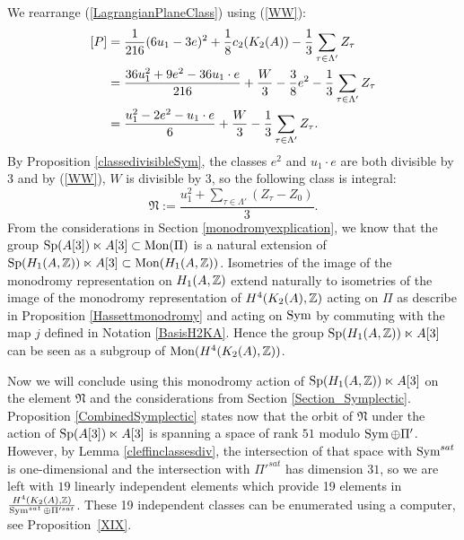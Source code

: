 We rearrange (\ref{LagrangianPlaneClass}) using (\ref{WW}):
\begin{align*}
\left[P\right]&=\frac{1}{216}(6u_1-3e)^2+\frac{1}{8}c_2(K_{ 2 }( A ))-\frac{1}{3}\sum_{\tau\in \Lambda'} Z_{\tau}\\
&=\frac{36u_1^2+9e^2-36u_1\cdot e}{216} +\frac{W}{3}-\frac{3}{8}e^2-\frac{1}{3}\sum_{\tau\in \Lambda'} Z_{\tau}\\
&=\frac{u_1^2-2e^2-u_1\cdot e}{6} +\frac{W}{3}-\frac{1}{3}\sum_{\tau\in \Lambda'} Z_{\tau}.
\end{align*}
By Proposition \ref{classedivisibleSym}, the classes $e^2$ and $u_1\cdot e$ are both divisible by 3 and by (\ref{WW}), $W$ is divisible by 3, so the following class is integral:
$$
\mathfrak{N}:=\frac{u_1^2+\sum_{\tau\in \Lambda'} (Z_{\tau}-Z_0)}{3}
.
$$
From the considerations in Section \ref{monodromyexplication}, we know that the group $\operatorname{Sp}(A[3])\ltimes A[3]\subset \operatorname{Mon}(\Pi)$ is a natural extension of 
$\operatorname{Sp}(H_1(A,\mathbb{Z}))\ltimes A[3]\subset \operatorname{Mon}(H_1(A,\mathbb{Z}))$. Isometries of the image of the monodromy representation on $H_1(A,\mathbb{Z})$ extend naturally to isometries of the image of the monodromy representation of $H^4(K_2(A),\mathbb{Z})$ acting on $\Pi$ as describe in Proposition \ref{Hassettmonodromy} and acting on $\operatorname{Sym}$ by commuting with the map $j$ defined in Notation \ref{BasisH2KA}.
Hence the group $\operatorname{Sp}(H_1(A,\mathbb{Z}))\ltimes A[3]$ can be seen as a subgroup of $\operatorname{Mon}(H^4(K_2(A),\mathbb{Z}))$. 

Now we will conclude using this monodromy action of $\operatorname{Sp}(H_1(A,\mathbb{Z}))\ltimes A[3]$ on the element $\mathfrak{N}$ and the considerations from Section \ref{Section_Symplectic}. 
Proposition \ref{CombinedSymplectic} states now that
the orbit of $\mathfrak{N}$ under the action of $\operatorname{Sp}(A[3])\ltimes A[3]$ is spanning a space of rank $51$ modulo $\operatorname{Sym}\oplus\Pi'$. However, by Lemma \ref{cleffinclassesdiv}, the intersection of that space with $\operatorname{Sym}^{sat}$ is one-dimensional and the intersection with $\Pi'^{sat}$ has dimension $31$, so we are left with $19$ linearly independent elements which provide 19 elements in $\frac{H^4(K_2(A),\mathbb{Z})}{\operatorname{Sym}^{sat}\oplus\Pi'^{sat}}$.
These 19 independent classes can be enumerated using a computer, see Proposition~\ref{XIX}. 

